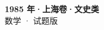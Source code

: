 \documentclass[zihao=-4, a4paper]{ctexart}
\begin{document}
\begin{center}
  {\Large\bfseries 1985 年·上海卷·文史类}\\[4pt]
  {\large 数学 · 试题版}
\end{center}
\medskip
{}

\end{document}
